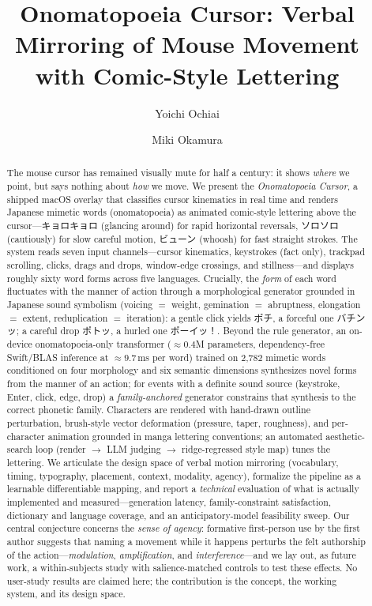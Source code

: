 \documentclass[sigconf,nonacm]{acmart}
\title{Onomatopoeia Cursor: Verbal Mirroring of Mouse Movement with Comic-Style Lettering}
\author{Yoichi Ochiai}
\affiliation{%
  \institution{University of Tsukuba}
  \city{Tsukuba}
  \country{Japan}
}
\author{Miki Okamura}
\affiliation{%
  \institution{University of Tsukuba}
  \city{Tsukuba}
  \country{Japan}
}
\newcommand{\jp}[1]{#1}
\begin{document}
\begin{abstract}
The mouse cursor has remained visually mute for half a century: it shows \emph{where} we point, but says nothing about \emph{how} we move. We present the \emph{Onomatopoeia Cursor}, a shipped macOS overlay that classifies cursor kinematics in real time and renders Japanese mimetic words (onomatopoeia) as animated comic-style lettering above the cursor---\jp{キョロキョロ} (glancing around) for rapid horizontal reversals, \jp{ソロソロ} (cautiously) for slow careful motion, \jp{ビューン} (whoosh) for fast straight strokes. The system reads seven input channels---cursor kinematics, keystrokes (fact only), trackpad scrolling, clicks, drags and drops, window-edge crossings, and stillness---and displays roughly sixty word forms across five languages. Crucially, the \emph{form} of each word fluctuates with the manner of action through a morphological generator grounded in Japanese sound symbolism (voicing $=$ weight, gemination $=$ abruptness, elongation $=$ extent, reduplication $=$ iteration): a gentle click yields \jp{ポチ}, a forceful one \jp{バチンッ}; a careful drop \jp{ポトッ}, a hurled one \jp{ポーイッ！}. Beyond the rule generator, an on-device onomatopoeia-only transformer (${\approx}0.4$M parameters, dependency-free Swift/BLAS inference at ${\approx}9.7$\,ms per word) trained on 2{,}782 mimetic words conditioned on four morphology and six semantic dimensions synthesizes novel forms from the manner of an action; for events with a definite sound source (keystroke, Enter, click, edge, drop) a \emph{family-anchored} generator constrains that synthesis to the correct phonetic family. Characters are rendered with hand-drawn outline perturbation, brush-style vector deformation (pressure, taper, roughness), and per-character animation grounded in manga lettering conventions; an automated aesthetic-search loop (render $\rightarrow$ LLM judging $\rightarrow$ ridge-regressed style map) tunes the lettering. We articulate the design space of verbal motion mirroring (vocabulary, timing, typography, placement, context, modality, agency), formalize the pipeline as a learnable differentiable mapping, and report a \emph{technical} evaluation of what is actually implemented and measured---generation latency, family-constraint satisfaction, dictionary and language coverage, and an anticipatory-model feasibility sweep. Our central conjecture concerns the \emph{sense of agency}: formative first-person use by the first author suggests that naming a movement while it happens perturbs the felt authorship of the action---\emph{modulation}, \emph{amplification}, and \emph{interference}---and we lay out, as future work, a within-subjects study with salience-matched controls to test these effects. No user-study results are claimed here; the contribution is the concept, the working system, and its design space.
\end{abstract}
\end{document}

